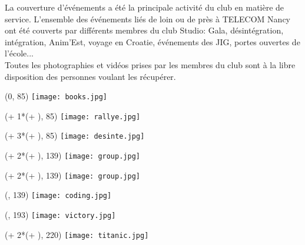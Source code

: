 La couverture d'événements a été la principale activité du club en matière de service. L'ensemble des événements liés de loin ou de près à TELECOM Nancy ont été couverts par différents membres du club Studio: Gala, désintégration, intégration, Anim'Est, voyage en Croatie, événements des JIG, portes ouvertes de l'école...\\

\noindent Toutes les photographies et vidéos prises par les membres du club sont à la libre disposition des personnes voulant les récupérer.

\begin{textblock}{0}(0, 85)
	\texttt{[image: books.jpg]}
\end{textblock}

\begin{textblock}{0}({\numexpr \fixMargin + 1*(\sizeMedia + \margin)}, 85)
	\texttt{[image: rallye.jpg]}
\end{textblock}

\begin{textblock}{0}({\numexpr \fixMargin + 3*(\sizeMedia + \margin)}, 85)
	\texttt{[image: desinte.jpg]}
\end{textblock}

\begin{textblock}{0}({\numexpr \fixMargin + 2*(\sizeMedia + \margin)}, 139)
	\texttt{[image: group.jpg]}
\end{textblock}

\begin{textblock}{0}({\numexpr \fixMargin + 2*(\sizeMedia + \margin)}, 139)
	\texttt{[image: group.jpg]}
\end{textblock}

\begin{textblock}{0}({\numexpr \fixMargin }, 139)
	\texttt{[image: coding.jpg]}
\end{textblock}

\begin{textblock}{0}({\numexpr \fixMargin }, 193)
	\texttt{[image: victory.jpg]}
\end{textblock}

\begin{textblock}{0}({\numexpr \fixMargin + 2*(\sizeMedia + \margin)}, 220)
	\texttt{[image: titanic.jpg]}
\end{textblock}

